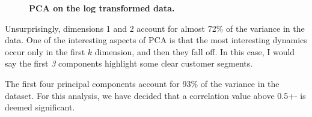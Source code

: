 \documentclass[twoside,openright,titlepage,numbers=noenddot,headinclude,%
               footinclude=true,cleardoublepage=empty,abstractoff,BCOR=5mm,%
               paper=a4,fontsize=11pt,ngerman,american]{scrreprt}
\numberwithin{theorem}{chapter}
\numberwithin{definition}{chapter}
\numberwithin{algorithm}{chapter}
\numberwithin{figure}{chapter}
\numberwithin{table}{chapter}
\numberwithin{equation}{chapter}
\begin{document}
\begin{figure}[!hbtp]
\centering
    
    \caption{\textbf{PCA on the log transformed data. }}
\end{figure}

Unsurprisingly, dimensions 1 and 2 account for almost 72\% of the variance in the data. One of the interesting aspects of PCA is that the most interesting dynamics occur only in the first $k$ dimension, and then they fall off. In this case, I would say the first \emph{3} components highlight some clear customer segments.    

The first four principal components account for 93\% of the variance in the dataset. For this analysis, we have decided that a correlation value above 0.5+- is deemed significant. 
\end{document}
